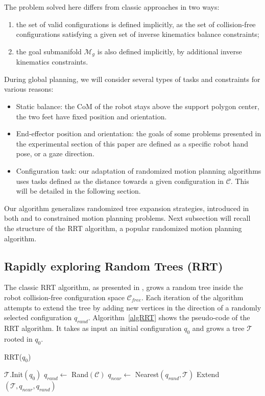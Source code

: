 \documentclass{article}
\newcommand\goalmanifold{\mathcal{M}_{g}}
\begin{document}
The problem solved here differs from classic approaches in two ways:
\begin{enumerate}
\item the set of valid configurations is defined implicitly, as the
  set of collision-free configurations satisfying a given set of
  inverse kinematics balance constraints;
\item the goal submanifold $\goalmanifold$ is also defined implicitly,
  by additional inverse kinematics constraints.
\end{enumerate}
During global planning, we will consider several types of
tasks and constraints for various reasons:
\begin{itemize}
\item Static balance: the CoM of the robot stays above
  the support polygon center, the two feet have fixed position and
  orientation.
\item End-effector position and orientation: the goals of some problems presented
  in the experimental section of this paper are defined as a specific robot hand pose,
  or a gaze direction.
\item Configuration task: our adaptation of randomized motion planning algorithms 
  uses tasks defined as the distance towards a given configuration in $\mathcal{C}$. 
  This will be detailed in the following section.
\end{itemize}


Our algorithm generalizes randomized tree expansion strategies, introduced in both \cite{HsuLat99c} and
\cite{kuffner00rrtconnect} to constrained motion planning problems. Next subsection will recall the structure of the RRT algorithm,
a popular randomized motion planning algorithm.


\subsection{Rapidly exploring Random Trees (RRT)}

The classic RRT algorithm, as presented in  \cite{kuffner00rrtconnect}, grows 
a random tree inside the robot 
collision-free configuration space 
$\mathcal{C}_{free}$. Each iteration of the algorithm attempts to extend the tree
by adding new vertices in the direction of a randomly selected configuration
$q_{rand}$. Algorithm~\ref{algRRT} shows the pseudo-code of the RRT algorithm.
It takes as input an initial configuration $q_0$ and grows a tree  $\mathcal{T}$ rooted 
in $q_0$. 

\begin{algorithm}
\caption{RRT($q_0$)}
\label{algRRT}
\begin{algorithmic}
\STATE $\mathcal{T}.$Init$(q_0)$
\STATE $q_{rand} \leftarrow $ Rand$(\mathcal{C})$
\STATE $q_{near} \leftarrow $ Nearest$(q_{rand},\mathcal{T})$
\STATE Extend$(\mathcal{T},q_{near},q_{rand})$
\ENDFOR

\end{algorithmic}
\end{algorithm}
\end{document}
